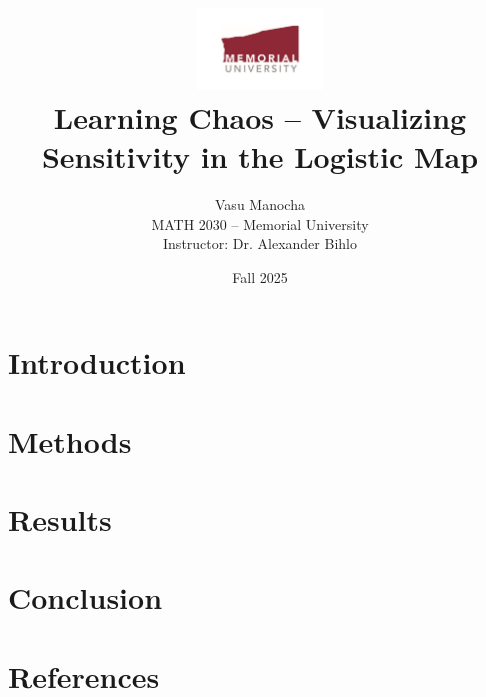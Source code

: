 \documentclass[12pt]{article}
\title{
  \includegraphics[width=0.25\textwidth]{../logo/mun_logo.pdf}\\[1em]
  \textbf{Learning Chaos – Visualizing Sensitivity in the Logistic Map}
}
\author{Vasu Manocha \\
MATH 2030 – Memorial University \\
Instructor: Dr. Alexander Bihlo}
\date{Fall 2025}
\begin{document}
\maketitle

\begin{abstract}
\end{abstract}

\section{Introduction}

\section{Methods}

\section{Results}

\section{Conclusion}

\section*{References}
\end{document}
